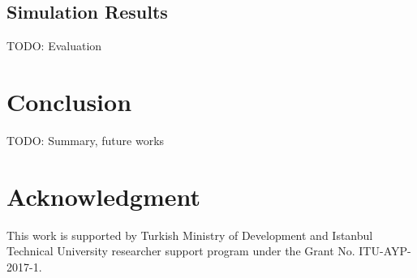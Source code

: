\documentclass[conference]{IEEEtran}
\begin{document}
\subsection{Simulation Results}
TODO: Evaluation


\section{Conclusion}
TODO: Summary, future works
\cite{7815384} \cite{7803607} \cite{7996384} \cite{8090518} \cite{s17061193} \cite{8267219} \cite{8430542} \cite{8319183} \cite{8480649} \cite{AN1200.22} \cite{Bor:2016:LLW:2988287.2989163} \cite{8406255} \cite{DBLP:journals/corr/abs-1802-10338} \cite{finnegan2018comparative}


\section*{Acknowledgment}
This work is supported by Turkish Ministry of Development and Istanbul Technical University researcher support program under the Grant No. ITU-AYP-2017-1.




\end{document}

